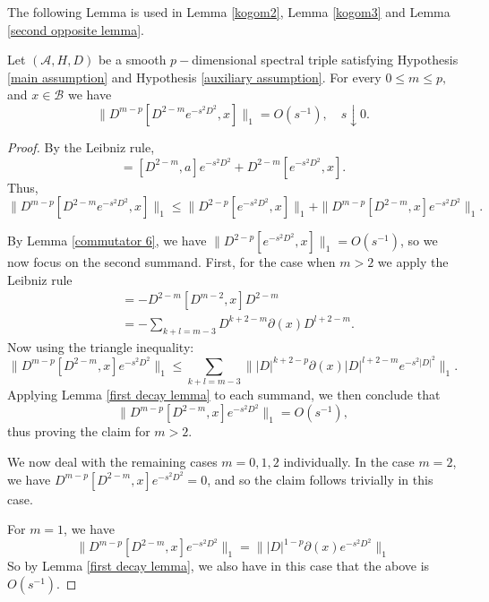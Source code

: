     The following Lemma is used in Lemma \ref{kogom2}, Lemma \ref{kogom3} and Lemma \ref{second opposite lemma}.
    \begin{lem}\label{commutator 7} 
        Let $(\mathcal{A},H,D)$ be a smooth $p-$dimensional spectral triple satisfying Hypothesis \ref{main assumption} and Hypothesis \ref{auxiliary assumption}. For every $0\leq m\leq p,$ and $x \in \mathcal{B}$ we have
        \begin{equation*}
            \|D^{m-p}[D^{2-m}e^{-s^2D^2},x]\|_1 = O(s^{-1}),\quad s\downarrow0.
        \end{equation*}
    \end{lem}
    \begin{proof} 
        By the Leibniz rule,
        \begin{equation*}
            [D^{2-m}e^{-s^2D^2},x] = [D^{2-m},a]e^{-s^2D^2}+D^{2-m}[e^{-s^2D^2},x].
        \end{equation*}
        Thus,
        \begin{equation*}
            \|D^{m-p}[D^{2-m}e^{-s^2D^2},x]\|_1 \leq \|D^{2-p}[e^{-s^2D^2},x]\|_1+\|D^{m-p}[D^{2-m},x]e^{-s^2D^2}\|_1.
        \end{equation*}
        
        By Lemma \ref{commutator 6}, we have $\|D^{2-p}[e^{-s^2D^2},x]\|_1 = O(s^{-1})$, so we now focus on the second summand.
        First, for the case when $m > 2$ we apply the Leibniz rule
        \begin{align*}
            [D^{2-m},x] &= -D^{2-m}[D^{m-2},x]D^{2-m}\\
                        &= -\sum_{k+l=m-3} D^{k+2-m}\partial(x)D^{l+2-m}.
        \end{align*}
        Now using the triangle inequality:
        \begin{equation*}
            \|D^{m-p}[D^{2-m},x]e^{-s^2D^2}\|_1 \leq \sum_{k+l=m-3}\||D|^{k+2-p}\partial(x)|D|^{l+2-m}e^{-s^2|D|^2}\|_1.
        \end{equation*}
        Applying Lemma \ref{first decay lemma} to each summand, we then conclude that $${\|D^{m-p}[D^{2-m},x]e^{-s^2D^2}\|_1 = O(s^{-1})},$$
        thus proving the claim for $m > 2$.
        
        We now deal with the remaining cases $m = 0,1,2$ individually.        
        In the case $m=2$, we have $D^{m-p}[D^{2-m},x]e^{-s^2D^2} = 0$, and so the claim follows trivially in this case.
        
        For $m = 1$, we have
        \begin{equation*}
            \|D^{m-p}[D^{2-m},x]e^{-s^2D^2}\|_1 = \||D|^{1-p}\partial(x)e^{-s^2D^2}\|_1
        \end{equation*}
        So by Lemma \ref{first decay lemma}, we also have in this case that the above is $O(s^{-1})$.
        

\end{proof}
